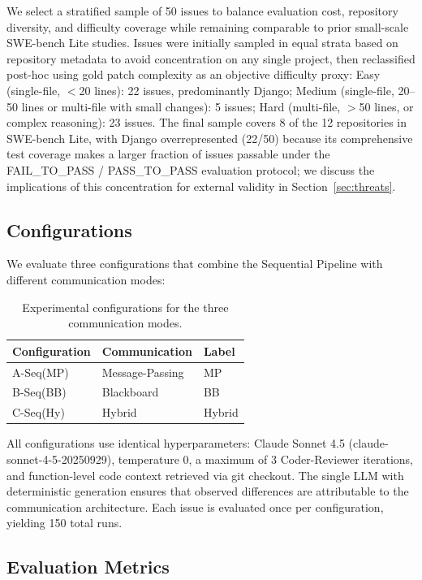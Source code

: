 \documentclass{ieeeaccess}
\begin{document}
We select a stratified sample of 50 issues to balance evaluation cost, repository diversity, and difficulty coverage while remaining comparable to prior small-scale SWE-bench Lite studies. Issues were initially sampled in equal strata based on repository metadata to avoid concentration on any single project, then reclassified post-hoc using gold patch complexity as an objective difficulty proxy: Easy (single-file, $<$20 lines): 22 issues, predominantly Django; Medium (single-file, 20--50 lines or multi-file with small changes): 5 issues; Hard (multi-file, $>$50 lines, or complex reasoning): 23 issues. The final sample covers 8 of the 12 repositories in SWE-bench Lite, with Django overrepresented (22/50) because its comprehensive test coverage makes a larger fraction of issues passable under the FAIL\_TO\_PASS / PASS\_TO\_PASS evaluation protocol; we discuss the implications of this concentration for external validity in Section~\ref{sec:threats}.

\subsection{Configurations}

We evaluate three configurations that combine the Sequential Pipeline with different communication modes:

\begin{table}[!ht]
\centering
\caption{Experimental configurations for the three communication modes.}
\label{tab:configurations}
\begin{tabular}{lll}
\toprule
\textbf{Configuration} & \textbf{Communication} & \textbf{Label} \\
\midrule
A-Seq(MP) & Message-Passing & MP \\
B-Seq(BB) & Blackboard & BB \\
C-Seq(Hy) & Hybrid & Hybrid \\
\bottomrule
\end{tabular}
\end{table}

All configurations use identical hyperparameters: Claude Sonnet 4.5 (claude-sonnet-4-5-20250929), temperature 0, a maximum of 3 Coder-Reviewer iterations, and function-level code context retrieved via git checkout. The single LLM with deterministic generation ensures that observed differences are attributable to the communication architecture. Each issue is evaluated once per configuration, yielding 150 total runs.

\subsection{Evaluation Metrics}
\end{document}
